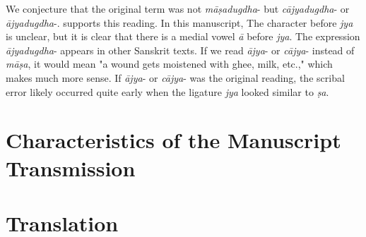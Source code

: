 We conjecture that the original term was not \emph{māṣadugdha}- 
but \emph{cājyadugdha}- or \emph{ājyadugdha}-. 
 supports this reading. 
In this manuscript, The character before \emph{jya} is unclear, 
but it is clear that there is a medial vowel \emph{ā} before \emph{jya}. 
The expression \emph{ājyadugdha}- appears in other Sanskrit texts. 
If we read \emph{ājya}- or \emph{cājya}- instead of \emph{māṣa}, 
it would mean "a wound gets moistened with ghee, milk, etc.," 
which makes much more sense. 
If \emph{ājya}- or \emph{cājya}- was the original reading, 
the scribal error likely occurred quite early 
when the ligature \emph{jya} looked similar to \emph{ṣa}.

\section{Characteristics of the Manuscript Transmission}


\newpage
\section{Translation}

